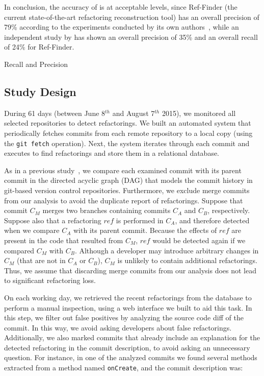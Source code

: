 In conclusion, the accuracy of \toolName is at acceptable levels,
since Ref-Finder (the current state-of-the-art refactoring reconstruction tool)
has an overall precision of 79\% according to the experiments conducted by its own authors~\citep{prete2010template},
while an independent study by \cite{Soares:2013} has shown an overall precision of 35\% and an overall recall of 24\% for Ref-Finder.

\begin{table}[htb]
\centering
\renewcommand{\arraystretch}{1.2}
\caption{\toolName Recall and Precision}
\label{TabRefDetectorEval}

\end{table}



\subsection{Study Design}
\label{sec:study_design}

During 61 days (between June 8$^{th}$ and August 7$^{th}$ 2015), we monitored all selected repositories to 
detect refactorings.
We built an automated system that periodically fetches commits from each remote repository to a local
copy (using the \texttt{git fetch} operation). Next, the system iterates through each commit and executes \toolName to
find refactorings and store them in a relational database.

As in a previous study~\citep{tsantalis_empiricalstudy}, we compare each examined commit with its parent 
commit in the directed acyclic graph (DAG) that models the commit history in git-based version control repositories.
Furthermore, we exclude merge commits from our analysis to avoid the duplicate report of refactorings.
Suppose that commit $C_M$ merges two branches containing commits $C_A$ and $C_B$, respectively.
Suppose also that a refactoring $\mathit{ref}$ is performed in $C_A$, and therefore detected when we compare 
$C_A$ with its parent commit.
Because the effects of $\mathit{ref}$ are present in the code that resulted from $C_M$, $\mathit{ref}$ 
would be detected again if we compared $C_M$ with $C_B$.
Although a developer may introduce arbitrary changes in $C_M$ (that are not in $C_A$ or $C_B$), $C_M$ is unlikely to contain additional refactorings.
Thus, we assume that discarding merge commits from our analysis does not lead to significant  refactoring loss.



On each working day, we retrieved the recent refactorings from the database to perform a manual inspection, using
a web interface we built to aid this task.
In this step, we filter out false positives by analyzing the source code diff of the commit. In this way, 
we avoid asking developers about false refactorings.
Additionally, we also marked commits that already include an explanation for the detected refactoring in
the commit description, to avoid asking an unnecessary question. For instance, in one of the analyzed commits
we found several methods extracted from a method named \texttt{onCreate}, and the commit description was:\margin

